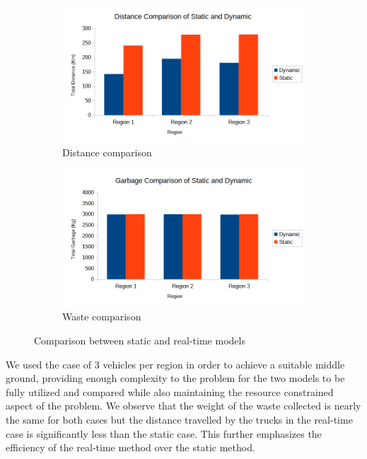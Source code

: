 \documentclass[12pt]{article}
\begin{document}
\begin{figure}[H]
    \centering
    \begin{subfigure}{0.5\textwidth}
        \centering
        \includegraphics[width=\linewidth]{Total Distance Comparision of Static and Dynamic.png}
        \caption{Distance comparison}\label{figh1}
    \end{subfigure}%
    \begin{subfigure}{0.5\textwidth}
        \centering
        \includegraphics[width=\linewidth]{Total Garbage Comparision of Static and Dynamic.png}
        \caption{Waste comparison}\label{figh2}
    \end{subfigure}
    \caption{Comparison between static and real-time models}
    \label{figh}
\end{figure}

We used the case of 3 vehicles per region in order to achieve a suitable middle ground, providing enough complexity to the problem for the two models to be fully utilized and compared while also maintaining the resource constrained aspect of the problem. We observe that the weight of the waste collected is nearly the same for both cases but the distance travelled by the trucks in the real-time case is significantly less than the static case. This further emphasizes the efficiency of the real-time method over the static method.
\end{document}
